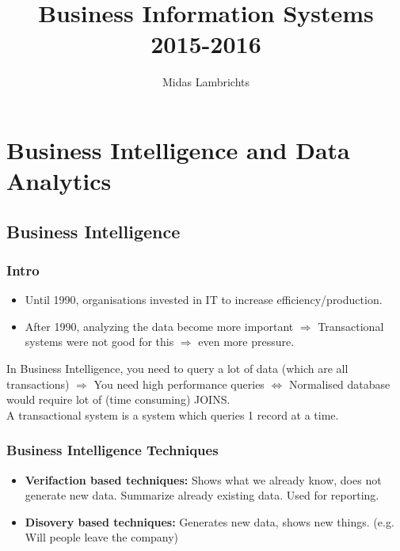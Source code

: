 \documentclass[a4paper,twoside,10pt]{report}
\begin{document}
\pagestyle{empty} %



\title{Business Information Systems \\ 2015-2016}
\author{Midas Lambrichts}
\maketitle


\tableofcontents %
\cleardoublepage %

\pagestyle{plain} %


\chapter{Business Intelligence and Data Analytics}
\section{Business Intelligence}
\subsection{Intro}
\begin{itemize}
	\item Until 1990, organisations invested in IT to increase efficiency/production.
	\item After 1990, analyzing the data become more important $\Rightarrow$ Transactional systems were not good for this $\Rightarrow$ even more pressure.
\end{itemize}

In Business Intelligence, you need to query a lot of data (which are all transactions) $\Rightarrow$ You need high performance queries $\Leftrightarrow$ Normalised database would require lot of (time consuming) JOINS.
\\
A transactional system is a system which queries 1 record at a time.

\subsection{Business Intelligence Techniques}
\begin{itemize}
	\item \textbf{Verifaction based techniques:} Shows what we already know, does not generate new data. Summarize already existing data. Used for reporting.
	\item \textbf{Disovery based techniques:} Generates new data, shows new things. (e.g. Will people leave the company)
\end{itemize}
\end{document}
